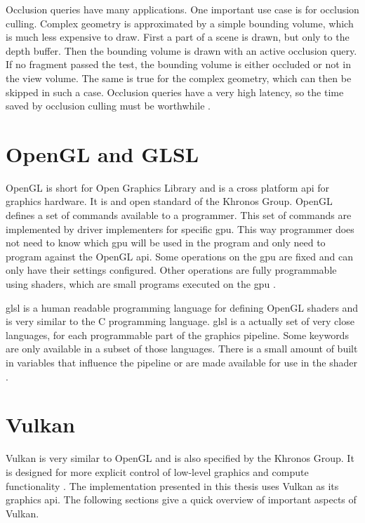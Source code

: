 Occlusion queries have many applications. One important use case is for occlusion culling. Complex geometry is approximated by a simple bounding volume, which is much less expensive to draw. First a part of a scene is drawn, but only to the depth buffer. Then the bounding volume is drawn with an active occlusion query. If no fragment passed the test, the bounding volume is either occluded or not in the view volume. The same is true for the complex geometry, which can then be skipped in such a case. Occlusion queries have a very high latency, so the time saved by occlusion culling must be worthwhile \cite{akine:2018:realtime, sellers:vulkanprogramming}.

\section{OpenGL and GLSL}
OpenGL is short for Open Graphics Library and is a cross platform \gls{api} for graphics hardware. It is and open standard of the Khronos Group. OpenGL defines a set of commands available to a programmer. This set of commands are implemented by driver implementers for specific \gls{gpu}. This way programmer does not need to know which \gls{gpu} will be used in the program and only need to program against the OpenGL \gls{api}. Some operations on the \gls{gpu} are fixed and can only have their settings configured. Other operations are fully programmable using shaders, which are small programs executed on the \gls{gpu} \cite{khronos:glsl4.60:spec}.

\Gls{glsl} is a human readable programming language for defining OpenGL shaders and is very similar to the C programming language. \Gls{glsl} is a actually set of very close languages, for each programmable part of the graphics pipeline. Some keywords are only available in a subset of those languages. There is a small amount of built in variables that influence the pipeline or are made available for use in the shader \cite{khronos:glsl4.60:spec}.


\section{Vulkan}
Vulkan is very similar to OpenGL and is also specified by the Khronos Group. It is designed for more explicit control of low-level graphics and compute functionality \cite{khronos:vulkan:spec1.1}. The implementation presented in this thesis uses Vulkan as its graphics \gls{api}. The following sections give a quick overview of important aspects of Vulkan.

